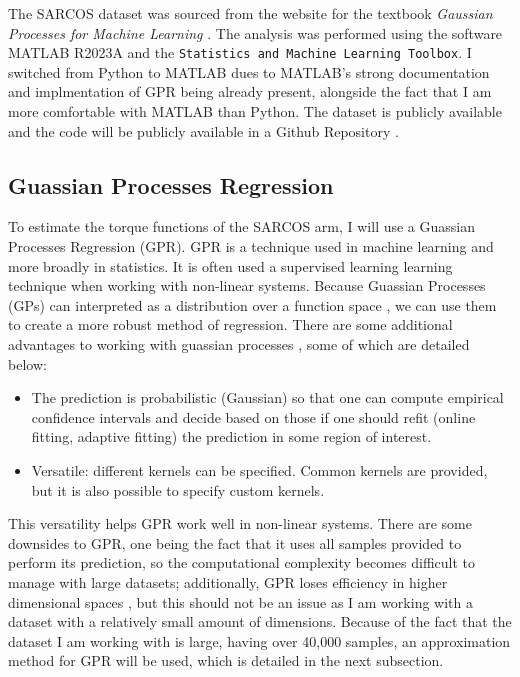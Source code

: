 \documentclass{article}
\begin{document}
    The SARCOS dataset was sourced from the website for the textbook 
    \textit{Gaussian Processes for Machine Learning} \citet{sarcos}. The analysis was performed
    using the software MATLAB R2023A and the \texttt{Statistics and Machine Learning Toolbox}. I
    switched from Python to MATLAB dues to MATLAB's strong documentation and implmentation of
    GPR being already present, alongside the fact that I am more comfortable with MATLAB than
    Python. The dataset is publicly available and the code will be publicly available in a Github
    Repository \citep{github}.
    
    \subsection{Guassian Processes Regression}
    
    To estimate the torque functions of the SARCOS arm, I will use a Guassian Processes Regression
    (GPR). GPR is a technique used in machine learning and more broadly in statistics. It is often
    used a supervised learning learning technique when working with non-linear systems. Because
    Guassian Processes (GPs) can interpreted as a distribution over a function space \citep{gpml},
    we can use them to create a more robust method of regression. There are some additional
    advantages to working with guassian processes \citep{scikit-gp}, some of which are detailed
    below:
    
    \begin{itemize}
        \item The prediction is probabilistic (Gaussian) so that one can compute empirical confidence intervals and decide based on those if one should refit (online fitting, adaptive fitting) the prediction in some region of interest.
        \item Versatile: different kernels can be specified. Common kernels are provided, but it is also possible to specify custom kernels.
    \end{itemize}
    
    This versatility helps GPR work well in non-linear systems. There are some downsides to GPR,
    one being the fact that it uses all samples provided to perform its prediction, so the
    computational complexity becomes difficult to manage with large datasets; additionally, GPR
    loses efficiency in higher dimensional spaces \citep{scikit-gp}, but this should not be an
    issue as I am working with a dataset with a relatively small amount of dimensions. Because of
    the fact that the dataset I am working with is large, having over 40,000 samples, an
    approximation method for GPR will be used, which is detailed in the next subsection.
    
\end{document}
